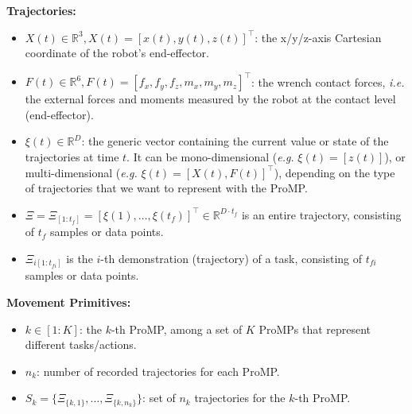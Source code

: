 \documentclass[utf8]{frontiersSCNS} %
\begin{document}
\noindent
\textbf{Trajectories:}
\begin{itemize}
\item $X(t)\in \mathbb{R}^3, X(t) = [x(t), y(t), z(t)]^\top$: the x/y/z-axis Cartesian coordinate of the robot's end-effector.
\item $F(t) \in \mathbb{R}^6, F(t) = [f_x, f_y, f_z, m_x, m_y, m_z]^\top$: the wrench contact forces, \textit{i.e.} the external forces and moments measured by the robot at the contact level (end-effector).
\item $\xi(t) \in \mathbb{R}^D$: the generic vector containing the current value or state of the trajectories at time $t$. It can be mono-dimensional (\textit{e.g.} $\xi(t) = [z(t)]$), or multi-dimensional (\textit{e.g.} $\xi(t) = [X(t), F(t)]^\top$), depending on the type of trajectories that we want to represent with the ProMP.


\item $\Xi = \Xi_{[1:t_{f}]} = [\xi(1), \ldots, \xi(t_{f})]^\top \in \mathbb{R}^{D \cdot t_{f}}$ is an entire trajectory, consisting of $t_f$ samples or data points. 

\item $\Xi_{i[1:t_{fi}]}$ is the $i$-th demonstration (trajectory) of a task, consisting of $t_{fi}$ samples or data points. 


\end{itemize}
\textbf{Movement Primitives:}
\begin{itemize}
\item $k \in [1:K]$: the $k$-th ProMP, among a set of $K$ ProMPs that represent different tasks/actions. 
\item $n_k$: number of recorded trajectories for each ProMP.
\item $S_k = \{\Xi_{\{k,1\}},\ldots,\Xi_{\{k,n_k\}}\}$: set of $n_k$ trajectories for the $k$-th ProMP. 
\end{itemize}
\end{document}
